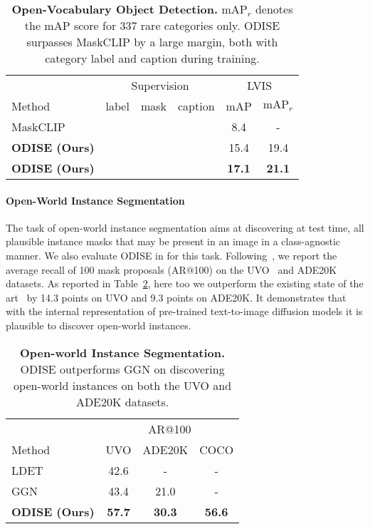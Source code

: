 \documentclass[10pt,twocolumn,letterpaper]{article}
\newcommand{\cmark}{\ding{51}}
\newcommand{\tablestyle}[2]{\setlength{\tabcolsep}{#1}\renewcommand{\arraystretch}{#2}\centering\small}
\newcommand{\ourmethod}{ODISE}
\begin{document}
\begin{table}[h]
\tablestyle{7pt}{1.1}
\begin{tabular}{l|ccc|cc}
                            & \multicolumn{3}{c}{Supervision} & \multicolumn{2}{c}{LVIS}       \\
Method                      & label    & mask     & caption   & mAP           & $\text{mAP}_r$ \\
\shline
MaskCLIP\cite{ding2022open} & \cmark   & \cmark   &           & 8.4           & -              \\
\hline
\hline
\textbf{\ourmethod{} (Ours)}   & \cmark   & \cmark   &           & 15.4          & 19.4           \\
\textbf{\ourmethod{} (Ours)}   &          & \cmark   & \cmark    & \textbf{17.1} & \textbf{21.1} 
\end{tabular}
\vspace{-.5em}
\caption{
\label{tab:object}
  \textbf{Open-Vocabulary Object Detection.} $\text{mAP}_r$ denotes the mAP score for 337 rare categories only. \ourmethod{} surpasses MaskCLIP by a large margin, both with category label and caption  during training.
}
\vspace{-1em}
\end{table}


\paragraph{Open-World Instance Segmentation}
The task of open-world instance segmentation aims at discovering at test time, all plausible instance masks that may be present in an image in a class-agnostic manner. 
We also evaluate \ourmethod{} in for this task.
Following~\cite{wang2022ggn}, we report the average recall of 100 mask proposals (AR@100) on the UVO~\cite{wang2021uvo} and ADE20K~\cite{zhou2019ade} datasets.
As reported in Table~\ref{tab:instance}, here too we outperform the existing state of the art~\cite{wang2022ggn} by 14.3 points on UVO and 9.3 points on ADE20K.
It demonstrates that with the internal representation of pre-trained text-to-image diffusion models it is plausible to discover open-world instances.

\begin{table}[h]
\tablestyle{7pt}{1.1}
\begin{tabular}{l|ccc}
                            & \multicolumn{3}{c}{AR@100}                    \\
Method                    & UVO           & ADE20K        & COCO          \\
\shline
LDET\cite{kim2022ldet}    & 42.6          & -             & -             \\
GGN\cite{wang2022ggn}     & 43.4          & 21.0          & -             \\
\textbf{\ourmethod{} (Ours)} & \textbf{57.7} & \textbf{30.3} & \textbf{56.6}
\end{tabular}
\vspace{-.5em}
\caption{
    \label{tab:instance}
    \textbf{Open-world Instance Segmentation.} \ourmethod{} outperforms GGN on discovering open-world instances on both the UVO and ADE20K datasets.
}
\vspace{-1em}
\end{table}
\end{document}
